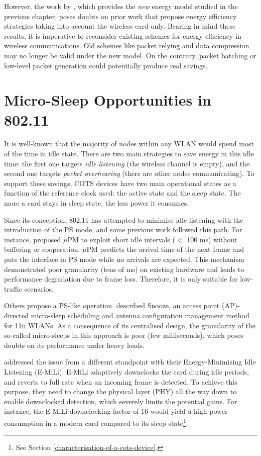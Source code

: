 \documentclass[twoside,nohyper]{tufte-book}
\theoremstyle{definition}
\theoremstyle{definition}
\theoremstyle{definition}
\theoremstyle{remark}
\begin{document}
However, the work by \citet{Serrano2014}, which provides the \emph{new}
energy model studied in the previous chapter, poses doubts on prior work
that propose energy efficiency strategies taking into account the
wireless card only. Bearing in mind these results, it is imperative to
reconsider existing schemes for energy efficiency in wireless
communications. Old schemes like packet relying \citep{He2010} and data
compression \citep{Baek2004, Sharma2009} may no longer be valid under
the new model. On the contrary, packet batching or low-level packet
generation could potentially produce real savings.

\section{Micro-Sleep Opportunities in
802.11}\label{micro-sleep-opportunities-in-802.11-1}

It is well-known that the majority of nodes within any WLAN would spend
most of the time in idle state. There are two main strategies to save
energy in this idle time: the first one targets \emph{idle listening}
(the wireless channel is empty), and the second one targets \emph{packet
overhearing} (there are other nodes communicating). To support these
savings, COTS devices have two main operational states as a function of
the reference clock used: the active state and the sleep state. The more
a card stays in sleep state, the less power it consumes.

Since its conception, 802.11 has attempted to minimise idle listening
with the introduction of the PS mode, and some previous work followed
this path. For instance, \citet{Liu2008} proposed \(\mu\)PM to exploit
short idle intervals (\(<\) 100 ms) without buffering or cooperation.
\(\mu\)PM predicts the arrival time of the next frame and puts the
interface in PS mode while no arrivals are expected. This mechanism
demonstrated poor granularity (tens of ms) on existing hardware and
leads to performance degradation due to frame loss. Therefore, it is
only suitable for low-traffic scenarios.

Others propose a PS-like operation. \citet{Jang2011} described Snooze,
an access point (AP)-directed micro-sleep scheduling and antenna
configuration management method for 11n WLANs. As a consequence of its
centralised design, the granularity of the so-called micro-sleeps in
this approach is poor (few milliseconds), which poses doubts on its
performance under heavy loads.

\citet{Zhang2012} addressed the issue from a different standpoint with
their Energy-Minimizing Idle Listening (E-MiLi). E-MiLi adaptively
downclocks the card during idle periods, and reverts to full rate when
an incoming frame is detected. To achieve this purpose, they need to
change the physical layer (PHY) all the way down to enable downclocked
detection, which severely limits the potential gains. For instance, the
E-MiLi downclocking factor of 16 would yield a high power consumption in
a modern card compared to its sleep state\footnote{See Section
  \ref{characterisation-of-a-cots-device}.}.
\end{document}
